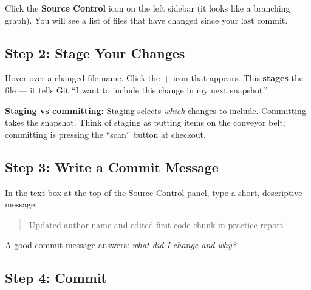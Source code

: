 \documentclass[
  letterpaper,
  DIV=11,
  numbers=noendperiod,
  oneside]{scrreprt}
\begin{document}
Click the \textbf{Source Control} icon on the left sidebar (it looks
like a branching graph). You will see a list of files that have changed
since your last commit.

\subsection*{Step 2: Stage Your
Changes}\label{step-2-stage-your-changes}

Hover over a changed file name. Click the \textbf{+} icon that appears.
This \textbf{stages} the file --- it tells Git ``I want to include this
change in my next snapshot.''

\begin{tcolorbox}[enhanced jigsaw, opacitybacktitle=0.6, colbacktitle=quarto-callout-note-color!10!white, breakable, opacityback=0, coltitle=black, toptitle=1mm, bottomrule=.15mm, colframe=quarto-callout-note-color-frame, bottomtitle=1mm, colback=white, leftrule=.75mm, rightrule=.15mm, title=\textcolor{quarto-callout-note-color}{\faInfo}\hspace{0.5em}{Note}, left=2mm, arc=.35mm, toprule=.15mm, titlerule=0mm]

\textbf{Staging vs committing:} Staging selects \emph{which} changes to
include. Committing takes the snapshot. Think of staging as putting
items on the conveyor belt; committing is pressing the ``scan'' button
at checkout.

\end{tcolorbox}

\subsection*{Step 3: Write a Commit
Message}\label{step-3-write-a-commit-message}

In the text box at the top of the Source Control panel, type a short,
descriptive message:

\begin{quote}
Updated author name and edited first code chunk in practice report
\end{quote}

A good commit message answers: \emph{what did I change and why?}

\subsection*{Step 4: Commit}\label{step-4-commit}
\end{document}
